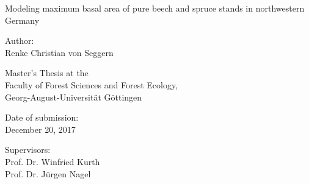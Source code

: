 \begin{titlepage}

\begin{center}

\vspace*{5cm}

{\LARGE Modeling maximum basal area of pure beech and spruce stands in northwestern Germany \\}

\vspace{2cm}

{\large Author: \\ Renke Christian von Seggern \par}

\vspace{2cm}

{\normalsize Master’s Thesis at the \\
  Faculty of Forest Sciences and Forest Ecology, \\
  Georg-August-Universität Göttingen}

\vspace{0.5cm}

{\normalsize Date of submission: \\ December 20, 2017 \par}

\vspace{0.5cm}

{\normalsize Supervisors: \\ Prof. Dr. Winfried Kurth \\ Prof. Dr. Jürgen Nagel \par}

\end{center}

\end{titlepage}

